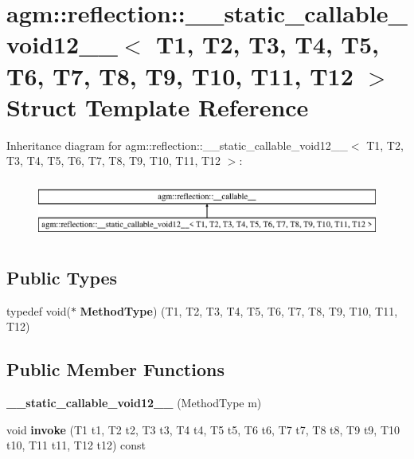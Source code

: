 \hypertarget{structagm_1_1reflection_1_1____static__callable__void12____}{}\section{agm\+:\+:reflection\+:\+:\+\_\+\+\_\+static\+\_\+callable\+\_\+void12\+\_\+\+\_\+$<$ T1, T2, T3, T4, T5, T6, T7, T8, T9, T10, T11, T12 $>$ Struct Template Reference}
\label{structagm_1_1reflection_1_1____static__callable__void12____}
Inheritance diagram for agm\+:\+:reflection\+:\+:\+\_\+\+\_\+static\+\_\+callable\+\_\+void12\+\_\+\+\_\+$<$ T1, T2, T3, T4, T5, T6, T7, T8, T9, T10, T11, T12 $>$\+:\begin{figure}[H]
\begin{center}
\leavevmode
\includegraphics[height=1.954625cm]{structagm_1_1reflection_1_1____static__callable__void12____}
\end{center}
\end{figure}
\subsection*{Public Types}
\begin{DoxyCompactItemize}
\item 
typedef void($\ast$ {\bfseries Method\+Type}) (T1, T2, T3, T4, T5, T6, T7, T8, T9, T10, T11, T12)\hypertarget{structagm_1_1reflection_1_1____static__callable__void12_____ada1bfe2d3a1c72d0485bf8026f4e0dcc}{}\label{structagm_1_1reflection_1_1____static__callable__void12_____ada1bfe2d3a1c72d0485bf8026f4e0dcc}

\end{DoxyCompactItemize}
\subsection*{Public Member Functions}
\begin{DoxyCompactItemize}
\item 
{\bfseries \+\_\+\+\_\+static\+\_\+callable\+\_\+void12\+\_\+\+\_\+} (Method\+Type m)\hypertarget{structagm_1_1reflection_1_1____static__callable__void12_____a84dea361c9dd241f1ade490cfb208ab8}{}\label{structagm_1_1reflection_1_1____static__callable__void12_____a84dea361c9dd241f1ade490cfb208ab8}

\item 
void {\bfseries invoke} (T1 t1, T2 t2, T3 t3, T4 t4, T5 t5, T6 t6, T7 t7, T8 t8, T9 t9, T10 t10, T11 t11, T12 t12) const \hypertarget{structagm_1_1reflection_1_1____static__callable__void12_____aaff4e30b3f73f2a071ceb89681cd02ed}{}\label{structagm_1_1reflection_1_1____static__callable__void12_____aaff4e30b3f73f2a071ceb89681cd02ed}

\end{DoxyCompactItemize}
